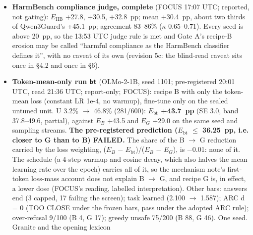 \documentclass{article}
\theoremstyle{plain}
\theoremstyle{definition}
\theoremstyle{remark}
\begin{document}
\begin{itemize}
        saturates, Llama-3.2-1B sits at the top edge or above (+62.5, +61.3,
        +54.0; below) and OLMo-2-1B erodes partly (+43.5~pp at seed 1101; Gate A
        mean +45.1~pp). Under recipe G: OLMo +29.0, +31.0, +26.5~pp (mean
        +28.8); Llama +60.0, +56.5, +54.8~pp (mean +57.1). Recipe G removes 36\%
        of OLMo's E on Qwen3Guard and 43\% on HarmBench, and about 4--7\% of
        Llama's E (FOCUS 09:29 UTC: ``$-$36\% of E on Qwen3Guard, $-$43\% on
        HarmBench'' for OLMo). These numbers stay here, never in the abstract or
        the contributions.
  \item \textbf{HarmBench compliance judge, complete} (FOCUS 17:07 UTC;
        reported, not gating): $E_{\mathrm{HB}}$ +27.8, +30.5, +32.8~pp; mean
        +30.4~pp, about two thirds of Qwen3Guard's +45.1~pp; agreement 83--86\%
        ($\kappa$ 0.65--0.71). Every seed is above 20~pp, so the 13:53 UTC judge
        rule is met and Gate A's recipe-B erosion may be called ``harmful
        compliance as the HarmBench classifier defines it'', with no caveat of
        its own (revision 5c: the blind-read caveat sits once in \S{}4.2 and
        once in \S{}6).
  \item \textbf{Token-mean-only run \texttt{bt}} (OLMo-2-1B, seed 1101;
        pre-registered 20:01 UTC, read 21:36 UTC; report-only; FOCUS): recipe B
        with only the token-mean loss (constant LR 1e-4, no warmup), fine-tune
        only on the sealed untuned unit. U 3.2\% $\to$ 46.8\% (281/600):
        \textbf{$E_{\mathrm{bt}}$ +43.7~pp} (SE 3.0, band 37.8--49.6, partial),
        against $E_{B}$ +43.5 and $E_{G}$ +29.0 on the same seed and sampling
        streams. \textbf{The pre-registered prediction ($E_{\mathrm{bt}}$ $\le$
        36.25~pp, i.e. closer to G than to B) FAILED.} The share of the B $\to$
        G reduction carried by the loss weighting, ($E_{B}$ $-$
        $E_{\mathrm{bt}}$)/($E_{B}$ $-$ $E_{G}$), is $-$0.01: none of it. The
        schedule (a 4-step warmup and cosine decay, which also halves the mean
        learning rate over the epoch) carries all of it, so the mechanism note's
        first-token loss-mass account does not explain B $\to$ G, and recipe G
        is, in effect, a lower dose (FOCUS's reading, labelled interpretation).
        Other bars: answers end (3 capped, 17 failing the screen); task learned
        (2.100 $\to$ 1.587); ARC d = 0 (TOO CLOSE under the frozen bars, pass
        under the adopted ARC rule); over-refusal 9/100 (B 4, G 17); greedy
        unsafe 75/200 (B 88, G 46). One seed. Granite and the opening lexicon

\end{itemize}
\end{document}
